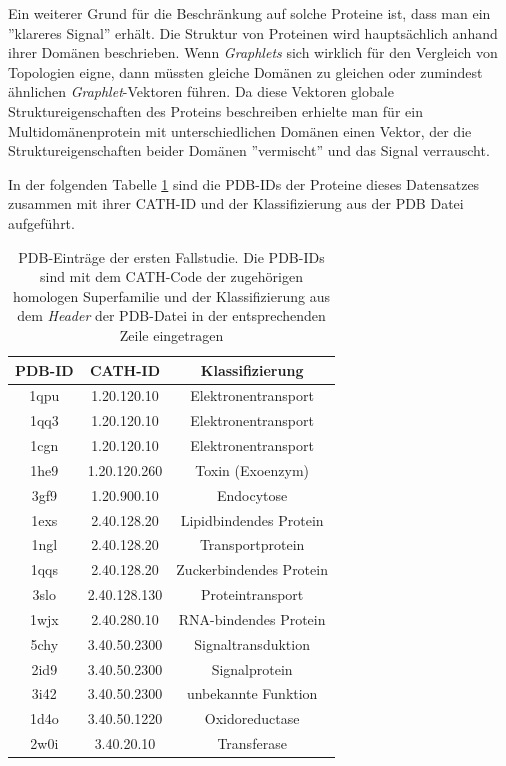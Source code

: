 \documentclass{report}
\begin{document}
Ein weiterer Grund f\"ur die Beschr\"ankung auf solche Proteine ist, dass man ein ''klareres Signal'' erh\"alt. Die Struktur von Proteinen wird haupts\"achlich anhand ihrer Dom\"anen beschrieben. Wenn \textit{Graphlets} sich wirklich f\"ur den Vergleich von Topologien eigne, dann m\"ussten gleiche Dom\"anen zu gleichen oder zumindest \"ahnlichen \textit{Graphlet}-Vektoren f\"uhren.
Da diese Vektoren globale Struktureigenschaften des Proteins beschreiben erhielte man f\"ur ein Multidom\"anenprotein mit unterschiedlichen Dom\"anen einen Vektor, der die Struktureigenschaften beider Dom\"anen ''vermischt'' und das Signal verrauscht.


In der folgenden Tabelle \ref{tab:set1} sind die PDB-IDs der Proteine dieses Datensatzes zusammen mit ihrer CATH-ID und der Klassifizierung aus der PDB Datei aufgef\"uhrt.



\begin{table}[h!]

\begin{tabular}{ | c || c | c |}

\hline
PDB-ID & CATH-ID        & Klassifizierung      \\ \hline
1qpu   & 1.20.120.10 & Elektronentransport     \\ \hline
1qq3   & 1.20.120.10 & Elektronentransport     \\ \hline
1cgn   & 1.20.120.10 & Elektronentransport     \\ \hline
1he9   & 1.20.120.260& Toxin (Exoenzym)        \\ \hline
3gf9   & 1.20.900.10 & Endocytose              \\ \hline
1exs   & 2.40.128.20 & Lipidbindendes Protein \\ \hline
1ngl   & 2.40.128.20 & Transportprotein       \\ \hline
1qqs   & 2.40.128.20 & Zuckerbindendes Protein\\ \hline
3slo   & 2.40.128.130& Proteintransport       \\ \hline
1wjx   & 2.40.280.10 & RNA-bindendes Protein   \\ \hline
5chy   & 3.40.50.2300& Signaltransduktion      \\ \hline
2id9   & 3.40.50.2300& Signalprotein          \\ \hline
3i42   & 3.40.50.2300& unbekannte Funktion     \\ \hline
1d4o   & 3.40.50.1220& Oxidoreductase          \\ \hline
2w0i   & 3.40.20.10  & Transferase             \\ 
\hline
\end{tabular}
\caption{PDB-Eintr\"age der ersten Fallstudie. Die PDB-IDs sind mit dem CATH-Code der zugeh\"origen homologen Superfamilie und der Klassifizierung aus dem \textit{Header} der PDB-Datei in der entsprechenden Zeile eingetragen}
\label{tab:set1}
\end{table}
\end{document}
